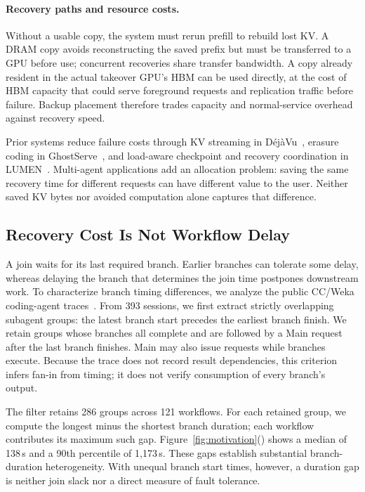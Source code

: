 \paragraph{Recovery paths and resource costs.}
Without a usable copy, the system must rerun prefill to rebuild lost KV.
A DRAM copy avoids reconstructing the saved prefix but must be transferred
to a GPU before use; concurrent recoveries share transfer bandwidth.
A copy already resident in the actual takeover GPU's HBM can be used
directly, at the cost of HBM capacity that could serve foreground requests
and replication traffic before failure. Backup placement therefore trades
capacity and normal-service overhead against recovery speed.

Prior systems reduce failure costs through KV streaming in
D\'{e}j\`{a}Vu~\cite{strati2024dejavu}, erasure coding in
GhostServe~\cite{jayakody2026ghostserve}, and load-aware checkpoint and
recovery coordination in LUMEN~\cite{cao2026lumen}. Multi-agent
applications add an allocation problem: saving the same recovery time for
different requests can have different value to the user. Neither saved KV
bytes nor avoided computation alone captures that difference.

\subsection{Recovery Cost Is Not Workflow Delay}
\label{sec:motivation-workflow}

A join waits for its last required branch. Earlier branches can tolerate
some delay, whereas delaying the branch that determines the join time
postpones downstream work. To characterize branch timing differences, we
analyze the public CC/Weka coding-agent
traces~\cite{semianalysis2026cctraces}. From 393 sessions, we first extract
strictly overlapping subagent groups: the latest branch start precedes
the earliest branch finish. We retain groups whose branches all complete
and are followed by a Main request after the last branch finishes.
Main may also issue requests while branches execute. Because the trace
does not record result dependencies, this criterion infers fan-in from
timing; it does not verify consumption of every branch's output.

The filter retains 286 groups across 121 workflows. For each retained
group, we compute the longest minus the shortest branch duration; each
workflow contributes its maximum such gap.
Figure~\ref{fig:motivation}() shows a median of
138\,s and a 90th percentile of 1,173\,s. These gaps establish substantial
branch-duration heterogeneity. With unequal branch start times, however,
a duration gap is neither join slack nor a direct measure of fault tolerance.

